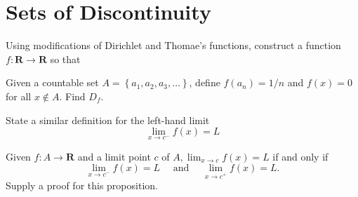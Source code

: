 \section{Sets of Discontinuity}


\begin{exercise}
  Using modifications of Dirichlet and Thomae's functions, construct a function $f: \mathbf{R} \rightarrow \mathbf{R}$ so that
\end{exercise}
\begin{solution}
\end{solution}

\begin{exercise}
  Given a countable set $A=\left\{a_{1}, a_{2}, a_{3}, \ldots\right\}$, define $f\left(a_{n}\right)=1 / n$ and $f(x)=0$ for all $x \notin A$. Find $D_{f}$.
\end{exercise}
\begin{solution}
  \TODO
\end{solution}

\begin{exercise}
  State a similar definition for the left-hand limit
  $$
  \lim _{x \rightarrow c^{-}} f(x)=L
  $$
\end{exercise}
\begin{solution}
  \TODO
\end{solution}

\begin{exercise}
  Given $f: A \rightarrow \mathbf{R}$ and a limit point $c$ of $A, \lim _{x \rightarrow c} f(x)=L$ if and only if
  $$
  \lim _{x \rightarrow c^{-}} f(x)=L \quad \text { and } \quad \lim _{x \rightarrow c^{+}} f(x)=L .
  $$
  Supply a proof for this proposition.
\end{exercise}
\begin{solution}
  \TODO
\end{solution}

